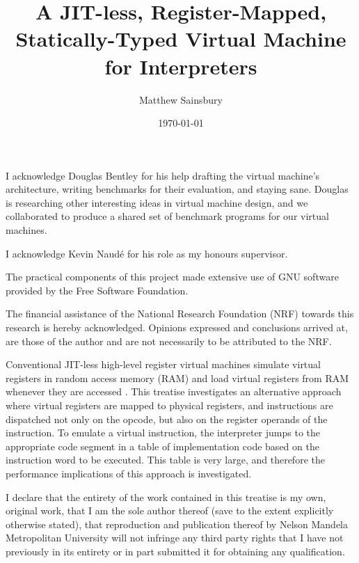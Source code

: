 



\title{A JIT-less, Register-Mapped, Statically-Typed Virtual Machine for Interpreters}
\author{Matthew Sainsbury}
\date{\today}

\begin{titlepage}

		\maketitle
	
\end{titlepage}


	I acknowledge Douglas Bentley for his help drafting the virtual machine's architecture, writing benchmarks for their evaluation, and staying sane. Douglas is researching other interesting ideas in virtual machine design, and we collaborated to produce a shared set of benchmark programs for our virtual machines.
	
	I acknowledge Kevin Naudé for his role as my honours supervisor.
	
	The practical components of this project made extensive use of GNU software provided by the Free Software Foundation.
	
	The financial assistance of the National Research Foundation (NRF) towards this research is hereby acknowledged. Opinions expressed and conclusions arrived at, are those of the author and are not necessarily to be attributed to the NRF.

	Conventional JIT-less high-level register virtual machines simulate virtual registers in random access memory (RAM) and load virtual registers from RAM whenever they are accessed \citep{caseregistervm}. This treatise investigates an alternative approach where virtual registers are mapped to physical registers, and instructions are dispatched not only on the opcode, but also on the register operands of the instruction. To emulate a virtual instruction, the interpreter jumps to the appropriate code segment in a table of implementation code based on the instruction word to be executed. This table is very large, and therefore the performance implications of this approach is investigated.

	I declare that the entirety of the work contained in this treatise is my own, original work, that I am the sole author thereof (save to the extent explicitly otherwise stated), that reproduction	and publication thereof by Nelson Mandela Metropolitan University will not infringe any third	party rights that I have not previously in its entirety or in part submitted it for obtaining any qualification.
	
